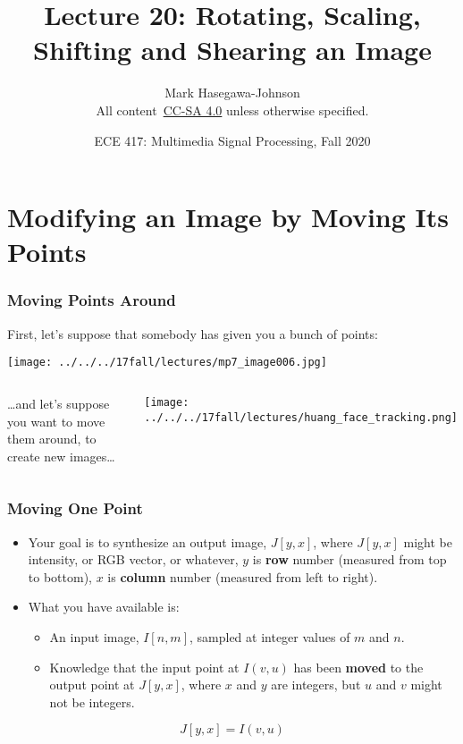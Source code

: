 \documentclass{beamer}
\title{Lecture 20: Rotating, Scaling, Shifting and Shearing an Image}
\author{Mark Hasegawa-Johnson\\All content~\href{https://creativecommons.org/licenses/by-sa/4.0/}{CC-SA 4.0} unless otherwise specified.}
\date{ECE 417: Multimedia Signal Processing, Fall 2020}
\institute{University of Illinois}
\begin{document}
\begin{frame}
  \maketitle
\end{frame}

\begin{frame}
  \tableofcontents
\end{frame}

\section{Modifying an Image by Moving Its Points}
\setcounter{subsection}{1}

\begin{frame}
  \frametitle{Moving Points Around}
  First, let's suppose that somebody has given you a bunch of points:
  \centerline{\texttt{[image: ../../../17fall/lectures/mp7\_image006.jpg]}}
\end{frame}

\begin{frame}
  \begin{columns}[t]
    \column{1in}
    \begin{block}{}
      \ldots and let's suppose you want to move them around, to create
      new images\ldots
    \end{block}
    \column{4in}
    \begin{block}{}
      \centerline{\texttt{[image: ../../../17fall/lectures/huang\_face\_tracking.png]}}
    \end{block}
  \end{columns}
\end{frame}

\begin{frame}
  \frametitle{Moving One Point}
  \begin{itemize}
  \item Your goal is to synthesize an output image, $J[y,x]$, where
    $J[y,x]$ might be intensity, or RGB vector, or whatever, $y$ is
    {\bf row} number (measured from top to bottom), $x$ is {\bf
      column} number (measured from left to right).
  \item What you have available is:
    \begin{itemize}
    \item An input image, $I[n,m]$, sampled at integer values of $m$ and $n$.
    \item Knowledge that the input point at $I(v,u)$ has been {\bf
      moved} to the output point at $J[y,x]$, where $x$ and $y$ are
      integers, but $u$ and $v$ might not be integers.
    \end{itemize}
  \end{itemize}
  \[
  J[y,x] = I(v,u)
  \]
\end{frame}
\end{document}
